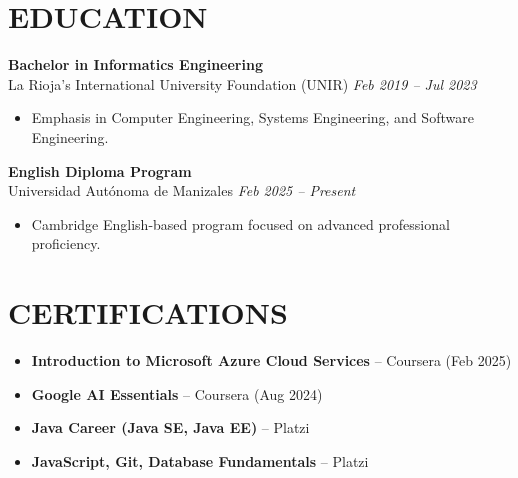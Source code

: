 \documentclass[11pt, a4paper]{article}
\begin{document}
\section*{EDUCATION}
\textbf{Bachelor in Informatics Engineering} \\
La Rioja’s International University Foundation (UNIR) \hfill \textit{Feb 2019 – Jul 2023}
\begin{itemize}[leftmargin=*, nosep, topsep=2pt]
	\item Emphasis in Computer Engineering, Systems Engineering, and Software Engineering.
\end{itemize}

\textbf{English Diploma Program} \\
Universidad Autónoma de Manizales \hfill \textit{Feb 2025 – Present}
\begin{itemize}[leftmargin=*, nosep, topsep=2pt]
	\item Cambridge English-based program focused on advanced professional proficiency.
\end{itemize}

\section*{CERTIFICATIONS}
\begin{itemize}[leftmargin=*, nosep]
	\item \textbf{Introduction to Microsoft Azure Cloud Services} – Coursera (Feb 2025)
	\item \textbf{Google AI Essentials} – Coursera (Aug 2024)
  \item \textbf{Java Career (Java SE, Java EE)} – Platzi
	\item \textbf{JavaScript, Git, Database Fundamentals} – Platzi
\end{itemize}
\end{document}
